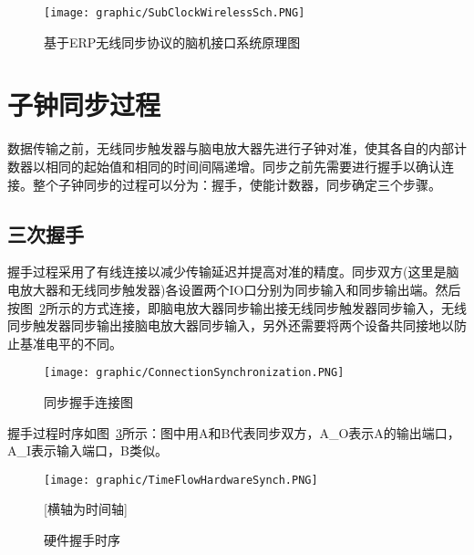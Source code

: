\begin{figure}[!hbp]
\begin{center}
\texttt{[image: graphic/SubClockWirelessSch.PNG]} 
\caption{ 基于ERP无线同步协议的脑机接口系统原理图 \label{WirelessTriggerSche}}
\end{center}
\end{figure}

\section{子钟同步过程}
数据传输之前，无线同步触发器与脑电放大器先进行子钟对准，使其各自的内部计数器以相同的起始值和相同的时间间隔递增。同步之前先需要进行握手以确认连接。整个子钟同步的过程可以分为：握手，使能计数器，同步确定三个步骤。
\subsection{三次握手}
	握手过程采用了有线连接以减少传输延迟并提高对准的精度。同步双方(这里是脑电放大器和无线同步触发器)各设置两个IO口分别为同步输入和同步输出端。然后按图~\ref{handshankeHard}所示的方式连接，即脑电放大器同步输出接无线同步触发器同步输入，无线同步触发器同步输出接脑电放大器同步输入，另外还需要将两个设备共同接地以防止基准电平的不同。

\begin{figure}[!hbp]
\begin{center}
\texttt{[image: graphic/ConnectionSynchronization.PNG]}
\caption{ 同步握手连接图 \label{handshankeHard}}
\end{center}
\end{figure}

握手过程时序如图~\ref{TFHardwareSyn}所示：图中用A和B代表同步双方，A\_{}O表示A的输出端口，A\_{}I表示输入端口，B类似。

\begin{figure}[!hbp]
\begin{center}
\texttt{[image: graphic/TimeFlowHardwareSynch.PNG]}
\caption{ 硬件握手时序 \label{TFHardwareSyn}}
[横轴为时间轴]
\end{center}
\end{figure}

